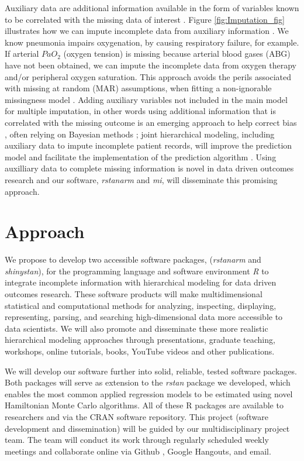 \documentclass[11pt,notitlepage]{article}
\begin{document}
Auxiliary data are additional information available in the form of variables known 
to be correlated with the missing data of interest 
\cite{Hall_25389642,Daniels24571539}. Figure \ref{fig:Imputation_fig} 
illustrates how we can impute incomplete data from auxiliary information 
\cite{Ibrahim2001auxilliaryImputaton,Schomaker23873614}. We know pneumonia 
impairs oxygenation, by causing respiratory failure, for example. If 
arterial $PaO_2$ (oxygen tension) is missing because arterial blood 
gases (ABG) have not been obtained, we can impute the incomplete data 
from oxygen therapy and/or peripheral oxygen saturation\cite{Hall_25389642}. 
This approach avoids the perils associated with missing at random (MAR) 
assumptions, when fitting a non-ignorable missingness model \cite{Wang_20029935}. 
Adding auxiliary variables not included in the main model for multiple imputation, 
in other words using additional information that is correlated with the missing 
outcome is an emerging approach to help correct bias 
\cite{Meng1994, Collins_11778676, Rubin1996}, often relying on 
Bayesian methods \cite{Daniels2008, Schafer1997}; joint hierarchical 
modeling, including auxiliary data to impute incomplete patient records, 
will improve the prediction model and facilitate the implementation of the 
prediction algorithm \cite{Hall_25389642}. Using auxilliary data to complete 
missing information is novel in data driven outcomes research and our 
software, \textit{rstanarm} and \textit{mi}, will disseminate this promising approach. 

\section*{Approach}

We propose to develop two accessible software packages, (\textit{rstanarm} 
and \textit{shinystan}), for the programming language and software environment 
\textit{R} to integrate incomplete information with hierarchical modeling for 
data driven outcomes research. These software products will make 
multidimensional statistical and computational methods for 
analyzing, inspecting, displaying, representing, parsing, and 
searching high-dimensional data more accessible to 
data scientists. We will also promote and disseminate these more realistic 
hierarchical modeling approaches through presentations, graduate teaching, 
workshops, online tutorials, books, YouTube videos and other publications.

We will develop our software further into solid, reliable, tested software packages. 
Both packages will serve as extension to the \textit{rstan} package we developed, 
which enables the most common applied regression models to be estimated using 
novel Hamiltonian Monte Carlo algorithms. All of these R packages are available to 
researchers and via the CRAN software repository. This project (software development and dissemination) will be guided by 
our multidisciplinary project team. The team will conduct its work through 
regularly scheduled weekly meetings and collaborate online via 
Github \cite{Chacon2009ProGit}, Google Hangouts, and email. 
\end{document}
